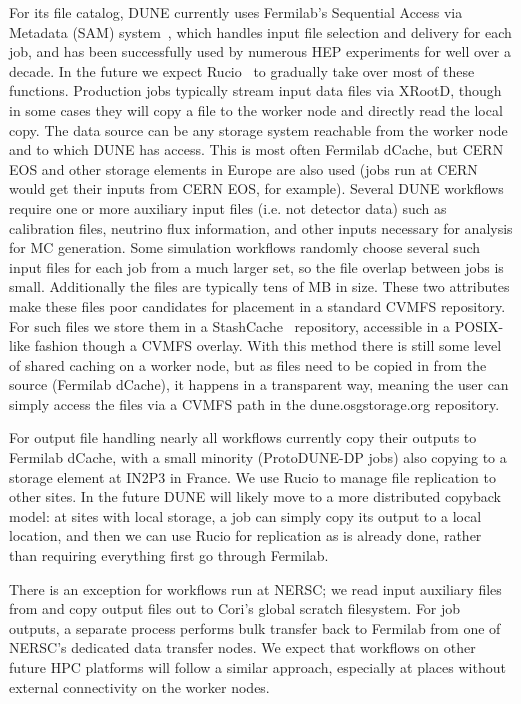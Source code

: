 \documentclass{webofc}
\begin{document}
For its file catalog, DUNE currently uses Fermilab's Sequential Access via Metadata (SAM) system~\cite{sam}, which handles input file selection and delivery for each job, and has been successfully used by numerous HEP experiments for well over a decade. In the future we expect Rucio~\cite{rucio} to gradually take over most of these functions. Production jobs typically stream input data files via XRootD, though in some cases they will copy a file to the worker node and directly read the local copy. The data source can be any storage system reachable from the worker
node and to which DUNE has access. This is most often Fermilab dCache, but CERN EOS and other storage elements in Europe are also used (jobs run at CERN would get their inputs from CERN EOS, for example). Several DUNE workflows require one or more auxiliary input files (i.e. not detector data) such as calibration files, neutrino flux information, and other inputs necessary for analysis for MC generation. Some simulation workflows randomly
choose several such input files for each job from a much larger set, so the file overlap between jobs is small. Additionally the files are typically tens of MB in size. These two attributes make these files poor candidates for placement in a standard CVMFS repository. For such files we store them in a StashCache~\cite{stashcache} repository,
accessible in a POSIX-like fashion though a CVMFS overlay. With this method there is still some level of shared caching on a worker node, but as files need to be copied in from the source (Fermilab dCache), it happens in a transparent way, meaning the user can simply access the files via a CVMFS path in the dune.osgstorage.org repository.

For output file handling nearly all workflows currently copy their outputs to Fermilab dCache, with a small minority (ProtoDUNE-DP jobs) also copying to a storage element at IN2P3 in France. We use Rucio to manage file replication
to other sites. In the future DUNE will likely move to a more distributed copyback model: at sites with local storage, a job can simply copy its output to a local location, and then we can use Rucio for replication as is already done, rather than requiring everything first go through Fermilab.

There is an exception for workflows run at NERSC; we read input auxiliary files from and copy output files out
to Cori's global scratch filesystem. For job outputs, a separate process performs bulk transfer back to Fermilab from one of NERSC's dedicated data transfer nodes. We expect that workflows on other future HPC platforms
will follow a similar approach, especially at places without external connectivity on the worker nodes.
\end{document}
